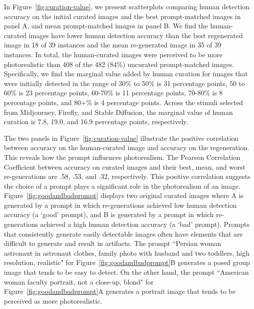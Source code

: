 In Figure~\ref{fig:curation-value}, we present scatterplots comparing human detection accuracy on the initial curated images and the best prompt-matched images in panel A, and mean prompt-matched images in panel B. We find the human-curated images have lower human detection accuracy than the best regenerated image in 18 of 39 instances and the mean re-generated image in 35 of 39 instances. In total, the human-curated images were perceived to be more photorealistic than 408 of the 482 (84\%) uncurated prompt-matched images. Specifically, we find the marginal value added by human curation for images that were initially detected in the range of 30\% to 50\% is 31 percentage points, 50 to 60\% is 23 percentage points, 60-70\% is 11 percentage points, 70-80\% is 8 percentage points, and 80+\% is 4 percentage points. Across the stimuli selected from Midjourney, Firefly, and Stable Diffusion, the marginal value of human curation is 7.8, 19.0, and 16.9 percentage points, respectively. 


The two panels in Figure~\ref{fig:curation-value} illustrate the positive correlation between accuracy on the human-curated image and accuracy on the regeneration. This reveals how the prompt influences photorealism. The Pearson Correlation Coefficient between accuracy on curated images and their best, mean, and worst re-generations are .58, .53, and .32, respectively. This positive correlation suggests the choice of a prompt plays a significant role in the photorealism of an image. Figure~\ref{fig:goodandbadprompt} displays two original curated images where A is generated by a prompt in which re-generations achieved low human detection accuracy (a `good' prompt), and B is generated by a prompt in which re-generations achieved a high human detection accuracy (a `bad' prompt). Prompts that consistently generate easily detectable images often have elements that are difficult to generate and result in artifacts. The prompt ``Persian woman astronaut in astronaut clothes, family photo with husband and two toddlers, high resolution, realistic" for Figure~\ref{fig:goodandbadprompt}B  generates a posed group image that tends to be easy to detect. On the other hand, the prompt ``American woman faculty portrait, not a close-up, blond" for Figure~\ref{fig:goodandbadprompt}A generates a portrait image that tends to be perceived as more photorealistic.